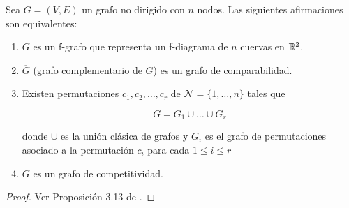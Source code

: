 \begin{prop}
Sea $G = (V,E)$ un grafo no dirigido con $n$ nodos. Las siguientes afirmaciones son equivalentes:

\begin{enumerate}
\item $G$ es un f-grafo que representa un f-diagrama de $n$ cuervas en $\mathbb{R}^2$.
\item $\overline{G}$ (grafo complementario de $G$) es un grafo de comparabilidad.
\item Existen permutaciones $c_1,c_2, \dots, c_r$ de $\mathcal{N} = \{1,\dots,n\}$ tales que

\begin{equation*}
G = G_1 \cup \dots \cup G_r
\end{equation*}

donde $\cup$ es la unión clásica de grafos y $G_i$ es el grafo de permutaciones asociado a la permutación $c_i$ para cada $1 \leq i \leq r$

\item $G$ es un grafo de competitividad.

\end{enumerate}
\end{prop}

\begin{proof} \label{thm:relaciones_entre_grafos}
Ver Proposición 3.13 de \cite{ongraphsassociatedtosetsofrankings}.
\end{proof}

